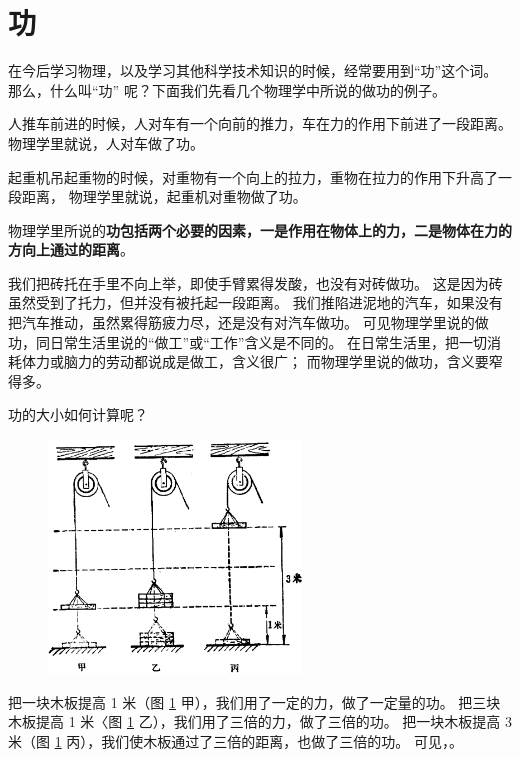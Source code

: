 \section{功}\label{sec:8-1}

在今后学习物理，以及学习其他科学技术知识的时候，经常要用到“功”这个词。
那么，什么叫“功” 呢？下面我们先看几个物理学中所说的做功的例子。

人推车前进的时候，人对车有一个向前的推力，车在力的作用下前进了一段距离。
物理学里就说，人对车做了功。

起重机吊起重物的时候，对重物有一个向上的拉力，重物在拉力的作用下升高了一段距离，
物理学里就说，起重机对重物做了功。

物理学里所说的\textbf{功包括两个必要的因素，一是作用在物体上的力，二是物体在力的方向上通过的距离}。

我们把砖托在手里不向上举，即使手臂累得发酸，也没有对砖做功。
这是因为砖虽然受到了托力，但并没有被托起一段距离。
我们推陷进泥地的汽车，如果没有把汽车推动，虽然累得筋疲力尽，还是没有对汽车做功。
可见物理学里说的做功，同日常生活里说的“做工”或“工作”含义是不同的。
在日常生活里，把一切消耗体力或脑力的劳动都说成是做工，含义很广；
而物理学里说的做功，含义要窄得多。

功的大小如何计算呢？

\begin{figure}[htbp]
    \centering
    \includegraphics[width=0.6\textwidth]{../pic/czwl1-ch8-1}
    \caption{}\label{fig:8-1}
\end{figure}

把一块木板提高 1 米（图 \ref{fig:8-1} 甲），我们用了一定的力，做了一定量的功。
把三块木板提高 1 米〈图 \ref{fig:8-1} 乙），我们用了三倍的力，做了三倍的功。
把一块木板提高 3 米（图 \ref{fig:8-1} 丙），我们使木板通过了三倍的距离，也做了三倍的功。
可见，。

